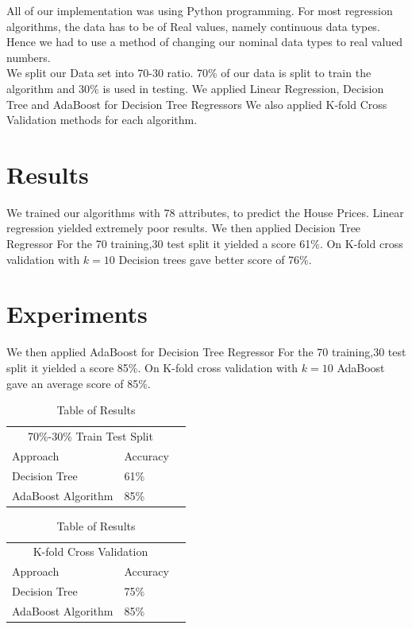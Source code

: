 \documentclass[fleqn,10pt]{SelfArx} %
\begin{document}
	 All of our implementation was using Python programming. For most regression algorithms, the data has to be of Real values, namely continuous data types. Hence we had to use a method of changing our nominal data types to real valued numbers\cite{dict}. \\
	 
	 We split our Data set into 70-30 ratio. 70\% of our data is split to train the algorithm and 30\% is used in testing. We applied Linear Regression, Decision Tree and AdaBoost for Decision Tree Regressors We also applied K-fold Cross Validation methods for each algorithm\cite{kfold}.
	
	
	\section{Results}
	We trained our algorithms with 78 attributes, to predict the House Prices. Linear regression yielded extremely poor results. We then applied Decision Tree Regressor For the 70 training,30 test split it yielded a score 61\%. On K-fold cross validation with $k=10$ Decision trees gave better score of 76\%.\\
	
	\section{Experiments}

	We then applied AdaBoost for Decision Tree Regressor For the 70 training,30 test split it yielded a score 85\%. On K-fold cross validation with $k=10$ AdaBoost gave an average score of 85\%.\\
	
	\begin{table}[hbt]
		\caption{Table of Results} \centering \begin{tabular}{llr} \toprule \multicolumn{2}{c}{70\%-30\% Train Test Split} \\ \cmidrule(r){1-2} Approach & Accuracy\\ \midrule Decision Tree & 61\% \\ 
			AdaBoost Algorithm & 85\% \\ \bottomrule \end{tabular} 
		\label{tab:label} 
	\end{table}
	
	\begin{table}[hbt]
		\caption{Table of Results} \centering \begin{tabular}{llr} \toprule \multicolumn{2}{c}{K-fold Cross Validation} \\ \cmidrule(r){1-2} Approach & Accuracy\\ \midrule Decision Tree & 75\% \\ 
				AdaBoost Algorithm & 85\% \\ \bottomrule \end{tabular} 
		\label{tab:label} 
	\end{table}
	
\end{document}
